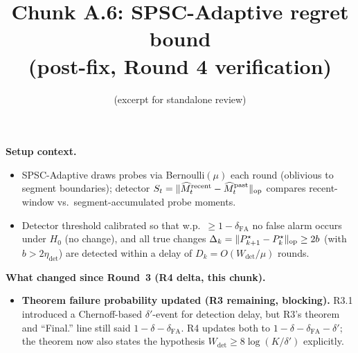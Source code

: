 

\title{Chunk A.6: SPSC-Adaptive regret bound\\(post-fix, Round 4 verification)}
\author{(excerpt for standalone review)}
\date{}


\maketitle

\textbf{Setup context.}
\begin{itemize}[leftmargin=*,itemsep=1pt,topsep=1pt]
\item SPSC-Adaptive draws probes via Bernoulli$(\mu)$ each round
(oblivious to segment boundaries); detector
$S_t=\|\widehat M_t^{\mathrm{recent}}-\widehat M_t^{\mathrm{past}}\|_{\mathrm{op}}$
compares recent-window vs.\ segment-accumulated probe moments.
\item Detector threshold calibrated so that w.p.\ $\ge 1-\delta_{\mathrm{FA}}$
no false alarm occurs under $H_0$ (no change), and all true changes
$\Delta_k=\|P_{k+1}^\star-P_k^\star\|_{\mathrm{op}}\ge 2b$ (with $b>2\eta_{\mathrm{det}}$)
are detected within a delay of $D_k=O(W_{\mathrm{det}}/\mu)$ rounds.
\end{itemize}

\textbf{What changed since Round~3 (R4 delta, this chunk).}
\begin{itemize}[leftmargin=*,itemsep=1pt,topsep=1pt]
\item \textbf{Theorem failure probability updated (R3 remaining, blocking).}
R3.1 introduced a Chernoff-based $\delta'$-event for detection delay,
but R3's theorem and ``Final.'' line still said $1-\delta-\delta_{\mathrm{FA}}$.
R4 updates both to $1-\delta-\delta_{\mathrm{FA}}-\delta'$; the theorem
now also states the hypothesis $W_{\mathrm{det}}\ge 8\log(K/\delta')$
explicitly.
\end{itemize}

